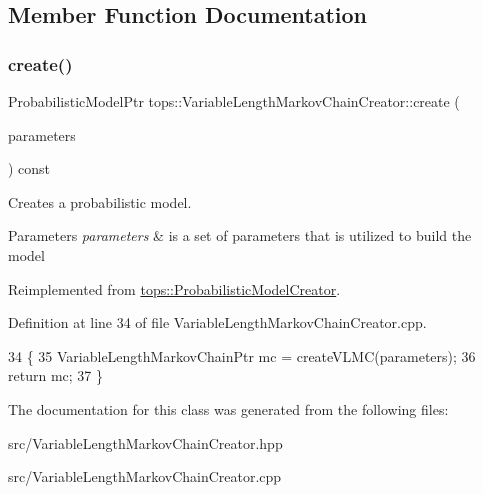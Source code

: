 \subsection{Member Function Documentation}
\mbox{\label{classtops_1_1VariableLengthMarkovChainCreator_a7b5275f19b97f4060274a7f8ec4f016b}} 
\subsubsection{\texorpdfstring{create()}{create()}}
{\footnotesize\ttfamily Probabilistic\+Model\+Ptr tops\+::\+Variable\+Length\+Markov\+Chain\+Creator\+::create (\begin{DoxyParamCaption}\item[{\hyperlink{classtops_1_1ProbabilisticModelParameters}{Probabilistic\+Model\+Parameters} \&}]{parameters }\end{DoxyParamCaption}) const\hspace{0.3cm}{\ttfamily [virtual]}}



Creates a probabilistic model. 


\begin{DoxyParams}{Parameters}
{\em parameters} & is a set of parameters that is utilized to build the model \\
\hline
\end{DoxyParams}


Reimplemented from \hyperlink{classtops_1_1ProbabilisticModelCreator_afed6c8ffa45fff446bdaa8b533da8f7c}{tops\+::\+Probabilistic\+Model\+Creator}.



Definition at line 34 of file Variable\+Length\+Markov\+Chain\+Creator.\+cpp.


\begin{DoxyCode}
34                                                                                                            
           \{
35     VariableLengthMarkovChainPtr mc = createVLMC(parameters);
36     \textcolor{keywordflow}{return} mc;
37   \}
\end{DoxyCode}


The documentation for this class was generated from the following files\+:\begin{DoxyCompactItemize}
\item 
src/Variable\+Length\+Markov\+Chain\+Creator.\+hpp\item 
src/Variable\+Length\+Markov\+Chain\+Creator.\+cpp\end{DoxyCompactItemize}
